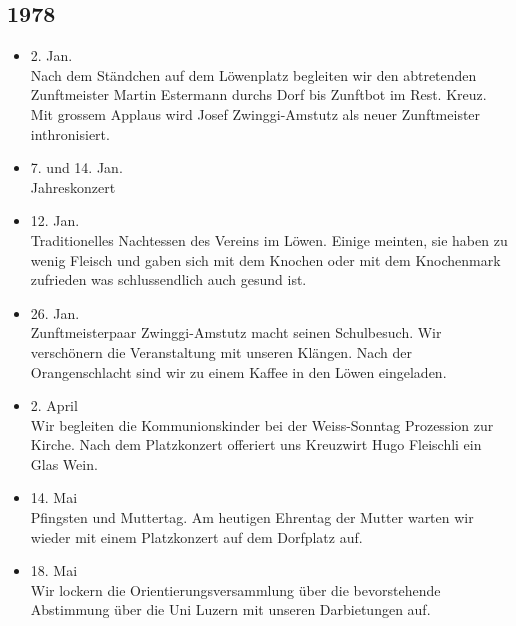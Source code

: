 \subsection*{1978}

\begin{history}


    \begin{itemize}

        \item 2. Jan.\\
              Nach dem Ständchen auf dem Löwenplatz begleiten wir den abtretenden
              Zunftmeister Martin Estermann durchs Dorf bis Zunftbot im Rest. Kreuz.
              Mit grossem Applaus wird Josef Zwinggi-Amstutz als neuer Zunftmeister
              inthronisiert.

        \item 7. und 14. Jan.\\
              Jahreskonzert

        \item 12. Jan.\\
              Traditionelles Nachtessen des Vereins im Löwen. Einige meinten, sie
              haben zu wenig Fleisch und gaben sich mit dem Knochen oder mit dem
              Knochenmark zufrieden was schlussendlich auch gesund ist.

        \item 26. Jan.\\
              Zunftmeisterpaar Zwinggi-Amstutz macht seinen Schulbesuch. Wir
              verschönern die Veranstaltung mit unseren Klängen. Nach der
              Orangenschlacht sind wir zu einem Kaffee in den Löwen eingeladen.

        \item 2. April\\
              Wir begleiten die Kommunionskinder bei der Weiss-Sonntag Prozession zur
              Kirche. Nach dem Platzkonzert offeriert uns Kreuzwirt Hugo Fleischli ein
              Glas Wein.

        \item 14. Mai\\
              Pfingsten und Muttertag. Am heutigen Ehrentag der Mutter warten wir
              wieder mit einem Platzkonzert auf dem Dorfplatz auf.

        \item 18. Mai\\
              Wir lockern die Orientierungsversammlung über die bevorstehende
              Abstimmung über die Uni Luzern mit unseren Darbietungen auf.


\end{itemize}
\end{history}
